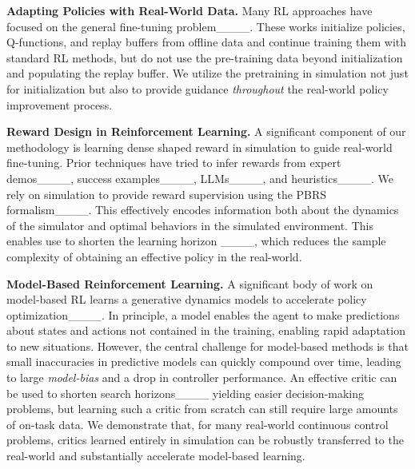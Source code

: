 \noindent\textbf{Adapting Policies with Real-World Data.} 
Many RL approaches have focused on the general fine-tuning problem____. These works initialize policies, Q-functions, and replay buffers from offline data and continue training them with standard RL methods, but do not use the pre-training data beyond initialization and populating the replay buffer. We utilize the pretraining in simulation not just for initialization but also to provide guidance \emph{throughout} the real-world policy improvement process. 


\noindent\textbf{Reward Design in Reinforcement Learning.} 
A significant component of our methodology is learning dense shaped reward in simulation to guide real-world fine-tuning. Prior techniques have tried to infer rewards from expert demos____, success examples____, LLMs____, and heuristics____. We rely on simulation to provide reward supervision using the PBRS formalism____. This effectively encodes information both about the dynamics of the simulator and optimal behaviors in the simulated environment. This enables use to shorten the learning horizon ____, which reduces the sample complexity of obtaining an effective policy in the real-world. 
\begin{comment}
Another line of work complementary to our comes from ____, which relabel rewards from off-task (simulated) data, effectively up-weighting transitions that approximately match the dynamics observed in the target domain. These works focus on the \emph{retrieval} of useful samples from prior datasets with shifted dynamics. In contrast, our approach uses prior data to guide the discovery of novel sequences of states and actions in the target domain. In principle, these techniques could be used in conjunction; we leave this to future work. 
\end{comment}



\noindent\textbf{Model-Based Reinforcement Learning.} A significant body of work on model-based RL learns a generative dynamics models to accelerate policy optimization____. In principle, a model enables the agent to make predictions about states and actions not contained in the training, enabling rapid adaptation to new situations. However, the central challenge for model-based methods is that small inaccuracies in predictive models can quickly compound over time, leading to large \emph{model-bias} and a drop in controller performance. An effective critic can be used to shorten search horizons____ yielding easier decision-making problems, but learning such a critic from scratch can still require large amounts of on-task data. We demonstrate that, for many real-world continuous control problems, critics learned entirely in simulation can be robustly transferred to the real-world and substantially accelerate model-based learning.  

